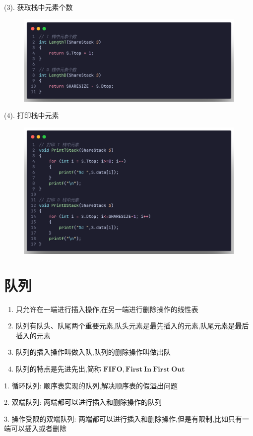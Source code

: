 (3). 获取栈中元素个数

\begin{figure}[H]
    \centering
    \includegraphics[scale=0.2]{"figure/Note/Stack/SSN.png"}
\end{figure}

(4). 打印栈中元素

\begin{figure}[H]
    \centering
    \includegraphics[scale=0.2]{"figure/Note/Stack/SSPrint.png"}
\end{figure}


\section{队列}
\begin{definition}[队列]
    \begin{enumerate}
        \item 只允许在一端进行插入操作,在另一端进行删除操作的线性表
        \item 队列有队头、队尾两个重要元素,队头元素是最先插入的元素,队尾元素是最后插入的元素
        \item 队列的插入操作叫做入队,队列的删除操作叫做出队
        \item 队列的特点是先进先出,简称 $\mathbf{FIFO}, \mathbf{First\ In\ First\ Out}$
    \end{enumerate}
\end{definition}
\begin{definition}[特殊队列]
    1. 循环队列: 顺序表实现的队列,解决顺序表的假溢出问题

    2. 双端队列: 两端都可以进行插入和删除操作的队列

    3. 操作受限的双端队列: 两端都可以进行插入和删除操作,但是有限制,比如只有一端可以插入或者删除
\end{definition}

